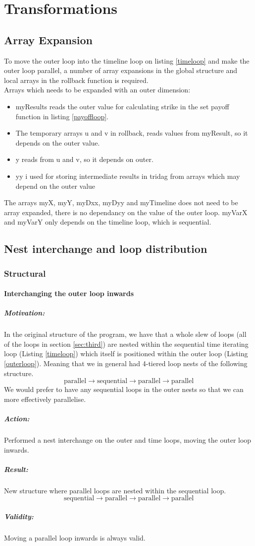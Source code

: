 \section{Transformations}

\subsection{Array Expansion}
\label{sec:arrayexp}
To move the outer loop into the timeline loop on listing \ref{timeloop} and make the outer loop parallel, a number of array expansions in the global structure and local arrays in the rollback function is required.\\
Arrays which needs to be expanded with an outer dimension: 
\begin{itemize}
\item myResults reads the outer value for calculating strike in the set payoff function in listing \ref{payoffloop}.
\item The temporary arrays u and v in rollback, reads values from myResult, so it depends on the outer value. 
\item y reads from u and v, so it depends on outer. 
\item yy i used for storing intermediate results in tridag from arrays which may depend on the outer value 
\end{itemize}

The arrays myX, myY, myDxx, myDyy and myTimeline does not need to be array expanded, there is no dependancy on the value of the outer loop. myVarX and myVarY only depends on the timeline loop, which is sequential.


\subsection{Nest interchange and loop distribution}

\subsubsection{Structural}
\paragraph{Interchanging the outer loop inwards}
\subparagraph{Motivation:} In the original structure of the program, we have that a whole slew of loops
 (all of the loops in section \ref{sec:third}) are nested
 within the sequential time iterating loop (Listing \ref{timeloop}) which itself is positioned within
 the outer loop (Listing \ref{outerloop}). Meaning that we in general had 4-tiered loop nests of the following
 structure.
$$\mathrm{parallel} \to \mathrm{sequential} \to \mathrm{parallel} \to \mathrm{parallel}$$
We would prefer to have any sequential loops in the outer nests so that we can more effectively
 parallelise.
\subparagraph{Action:} Performed a nest interchange on the outer and time loops, moving the outer loop inwards.
\subparagraph{Result:} New structure where parallel loops are nested within the sequential loop.
$$\mathrm{sequential} \to \mathrm{parallel} \to \mathrm{parallel} \to \mathrm{parallel}$$
\subparagraph{Validity:} Moving a parallel loop inwards is always valid.

